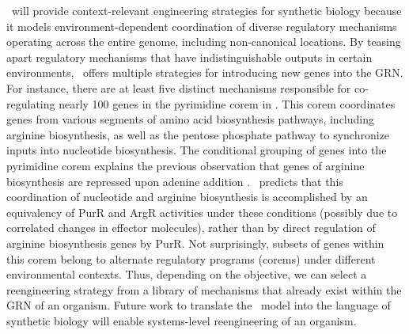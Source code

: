 \egrine~will provide context-relevant engineering strategies for synthetic biology because it models environment-dependent coordination of diverse regulatory mechanisms operating across the entire genome, including non-canonical locations. By teasing apart regulatory mechanisms that have indistinguishable outputs in certain environments, \egrine~offers multiple strategies for introducing new genes into the GRN. For instance, there are at least five distinct mechanisms responsible for co-regulating nearly 100 genes in the pyrimidine corem in \eco. This corem coordinates genes from various segments of amino acid biosynthesis pathways, including arginine biosynthesis, as well as the pentose phosphate pathway to synchronize inputs into nucleotide biosynthesis. The conditional grouping of genes into the pyrimidine corem explains the previous observation that genes of arginine biosynthesis are repressed upon adenine addition \cite{cho_purr_2011}. \egrine~predicts that this coordination of nucleotide and arginine biosynthesis is accomplished by an equivalency of PurR and ArgR activities under these conditions (possibly due to correlated changes in effector molecules), rather than by direct regulation of arginine biosynthesis genes by PurR. Not surprisingly, subsets of genes within this corem belong to alternate regulatory programs (corems) under different environmental contexts. Thus, depending on the objective, we can select a reengineering strategy from a library of mechanisms that already exist within the GRN of an organism. Future work to translate the \egrine~model into the language of synthetic biology will enable systems-level reengineering of an organism.
